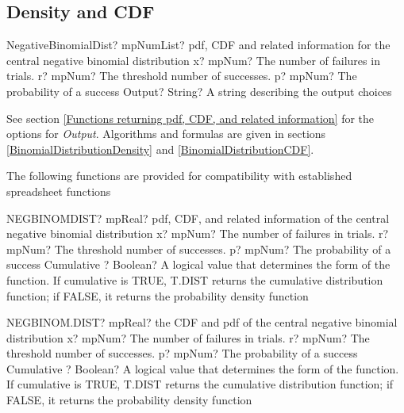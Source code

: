\subsection{Density and CDF}

\begin{mpFunctionsExtract}
	\mpFunctionFourNotImplemented
	{NegativeBinomialDist? mpNumList? pdf, CDF and related information for the central negative binomial distribution}
	{x? mpNum? The number of failures in trials.}
	{r? mpNum? The threshold number of successes.}
	{p? mpNum? The probability of a success}
	{Output? String? A string describing the output choices}
\end{mpFunctionsExtract}


\vspace{0.3cm}
See section \ref{Functions returning pdf, CDF, and related information} for the options for {\itshape\sffamily Output}. Algorithms and formulas are given in sections \ref{BinomialDistributionDensity} and \ref{BinomialDistributionCDF}.


\vspace{0.3cm}

The following functions are provided for compatibility with established spreadsheet functions

\vspace{0.6cm}
\begin{mpFunctionsExtract}
	\mpWorksheetFunctionFourNotImplemented
	{NEGBINOMDIST? mpReal? pdf, CDF, and related information of the central negative binomial distribution}
	{x? mpNum? The number of failures in trials.}
	{r? mpNum? The threshold number of successes.}
	{p? mpNum? The probability of a success}
	{Cumulative ? Boolean? A logical value that determines the form of the function. If cumulative is TRUE, T.DIST returns the cumulative distribution function; if FALSE, it returns the probability density function}
\end{mpFunctionsExtract}


\vspace{0.6cm}
\begin{mpFunctionsExtract}
	\mpWorksheetFunctionFourNotImplemented
	{NEGBINOM.DIST? mpReal? the CDF and pdf of the central negative binomial distribution}
	{x? mpNum? The number of failures in trials.}
	{r? mpNum? The threshold number of successes.}
	{p? mpNum? The probability of a success}
	{Cumulative ? Boolean? A logical value that determines the form of the function. If cumulative is TRUE, T.DIST returns the cumulative distribution function; if FALSE, it returns the probability density function}
\end{mpFunctionsExtract}




